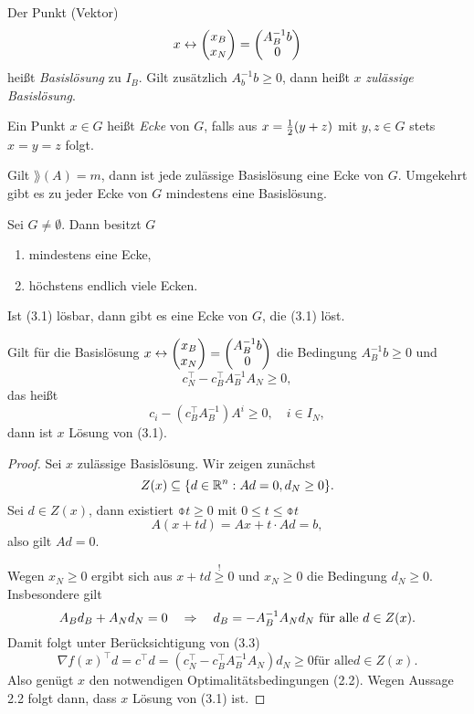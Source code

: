 \begin{defn} %
  Der Punkt (Vektor)
  \[ x \leftrightarrow \begin{pmatrix} x_B \\ x_N \end{pmatrix} = \begin{pmatrix}A_B^{-1} b \\ 0 \end{pmatrix} \]
  heißt \emph{Basislösung} zu $I_B$. Gilt zusätzlich $A_b^{-1} b \ge 0$, dann
  heißt $x$ \emph{zulässige Basislösung}.
\end{defn}

\begin{defn} %
  Ein Punkt $x \in G$ heißt \emph{Ecke} von $G$, falls aus $x = \frac{1}{2}(y+z)$
  mit $y,z \in G$ stets $x = y = z$ folgt.
\end{defn}

\clearpage

\begin{thm} %
  Gilt $\rang(A) = m$, dann ist jede zulässige Basislösung eine Ecke von $G$.
  Umgekehrt gibt es zu jeder Ecke von $G$ mindestens eine Basislösung.
\end{thm}

\begin{thm} %
  Sei $G \ne \emptyset$. Dann besitzt $G$
  \begin{enumerate}[(1)]
  \item mindestens eine Ecke,
  \item höchstens endlich viele Ecken.
  \end{enumerate}
\end{thm}

\begin{thm} %
  Ist (3.1) lösbar, dann gibt es eine Ecke von $G$, die (3.1) löst.
\end{thm}

\begin{aus}[Optimalitätskriterium] %
  Gilt für die Basislösung $x \leftrightarrow \begin{pmatrix}x_B \\ x_N \end{pmatrix} =
  \begin{pmatrix}A_B^{-1} b \\ 0 \end{pmatrix}$ die Bedingung $A_B^{-1} b \ge 0$ und
  \[ c_N^\top - c_B^\top A_B^{-1} A_N \ge 0, \]
  das heißt
  \[ c_i - (c_B^\top A_B^{-1})A^i \ge 0, \quad i \in I_N, \]
  dann ist $x$ Lösung von (3.1).
\end{aus}

\begin{proof}
  Sei $x$ zulässige Basislösung. Wir zeigen zunächst
  \[ Z(x) \subseteq \{ d \in \mathbb{R}^n : Ad = 0, d_N \ge 0 \}. \]
  Sei $d \in Z(x)$, dann existiert $\obar{t} \ge 0$ mit $0 \le t \le \obar{t}$
  \[ A(x+td) = Ax + t \cdot Ad = b, \]
  also gilt $Ad = 0$.

  Wegen $x_N \ge 0$ ergibt sich aus $x + td \overset{!}{\ge} 0$ und $x_N \ge 0$
  die Bedingung $d_N \ge 0$. Insbesondere gilt
  \[ A_B d_B + A_N d_N = 0 \quad \Rightarrow \quad d_B = - A_B^{-1} A_N d_N \text{ für alle } d
    \in Z(x). \]
  Damit folgt unter Berücksichtigung von (3.3)
  \[ \nabla f(x)^\top d = c^\top d = ( c_N^\top - c_B^\top A_B^{-1} A_N) d_N \ge 0 \text{
      für alle} d \in Z(x). \]
  Also genügt $x$ den notwendigen Optimalitätsbedingungen (2.2). Wegen Aussage
  2.2 folgt dann, dass $x$ Lösung von (3.1) ist.
\end{proof}

